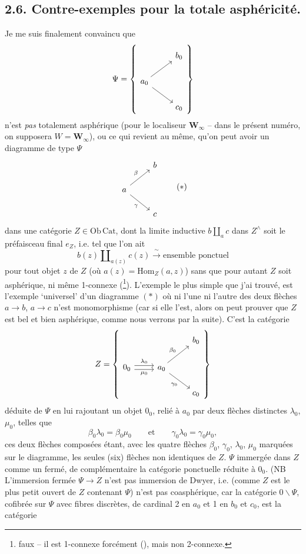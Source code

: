 \documentclass[11pt]{article}
\newcommand{\printedpage}[1]{\marginpar{\footnotesize p.~#1}}
\newcommand{\msp}[1]{\marginpar{\footnotesize [#1]}}
\newcommand{\Hom}{\mathrm{Hom}}
\newcommand{\Winf}{\mathbf{W}_{\infty}}
\begin{document}
\msp{page 10}
\subsection*{2.6. Contre-exemples pour la totale asphéricité.}

Je me suis finalement convaincu que
\[
\Psi = \left\{
\begin{tikzcd}
& b_0 \\
a_0 \arrow[ur] \arrow[dr] & \\
& c_0
\end{tikzcd}
\right\}
\]
\printedpage{7}
n'est \textit{pas} totalement asphérique (pour le localiseur $\Winf$ -- dans le présent numéro, on supposera $W = \Winf$), ou ce qui revient au même, qu'on peut avoir un diagramme de type $\Psi$
\[
\begin{tikzcd}
& b \\
a \arrow[ur, "\beta"] \arrow[dr, "\gamma"'] & \\
& c
\end{tikzcd}
\tag*{$(*)$}
\]
dans une catégorie $Z \in \mathrm{Ob}\,\mathrm{Cat}$, dont la limite inductive $b \amalg_a c$ dans $Z^{\wedge}$ soit le préfaisceau final $e_Z$, i.e. tel que l'on ait
\[ b(z) \amalg_{a(z)} c(z) \xrightarrow{\ \sim\ } \text{ensemble ponctuel} \]
pour tout objet $z$ de $Z$ (où $a(z) = \Hom_Z(a,z)$) sans que pour autant $Z$ soit asphérique, ni même 1-connexe (\footnote[5]{faux -- il est 1-connexe forcément (\footnotemark[6]), mais non 2-connexe.}). L'exemple le plus simple que j'ai trouvé, est l'exemple ‘universel’ d'un diagramme $(*)$ où ni l'une ni l'autre des deux flèches $a \longrightarrow b$, $a \longrightarrow c$ n'est monomorphisme (car si elle l'est, alors on peut prouver que $Z$ est bel et bien asphérique, comme nous verrons par la suite). C'est la catégorie
\[
Z = \left\{
\begin{tikzcd}
& & b_0 \\
0_0 \arrow[r, shift left, "\lambda_0"] \arrow[r, shift right, "\mu_0"'] & a_0 \arrow[ur, "\beta_0"] \arrow[dr, "\gamma_0"'] & \\
& & c_0
\end{tikzcd}
\right\}
\]
\msp{page 11}
déduite de $\Psi$ en lui rajoutant un objet $0_0$, relié à $a_0$ par deux flèches distinctes $\lambda_0$, $\mu_0$, telles que
\[ \beta_0\lambda_0 = \beta_0\mu_0 \qquad \text{et} \qquad \gamma_0\lambda_0 = \gamma_0\mu_0, \]
ces deux flèches composées étant, avec les quatre flèches $\beta_0$, $\gamma_0$, $\lambda_0$, $\mu_0$ marquées sur le diagramme, les seules (six) flèches non identiques de $Z$. $\Psi$ immergée dans $Z$ comme un fermé, de complémentaire la catégorie ponctuelle réduite à $0_0$. (NB L'immersion fermée $\Psi \longrightarrow Z$ n'est pas immersion de Dwyer, i.e. (comme $Z$ est le plus petit ouvert de $Z$ contenant $\Psi$) n'est pas coasphérique, car la catégorie $0\backslash\Psi$, cofibrée sur $\Psi$ avec fibres discrètes, de cardinal 2 en $a_0$ et 1 en $b_0$ et $c_0$, est la catégorie
\end{document}
